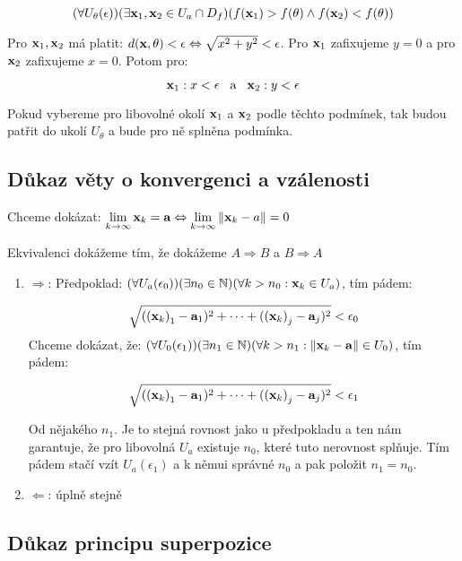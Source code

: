 \[ (\forall U_\theta(\epsilon))(\exists \mathbf{x}_1, \mathbf{x}_2 \in U_a \cap D_f)(f(\mathbf{x}_1) > f(\theta) \wedge f(\mathbf{x}_2) < f(\theta)) \]

\noindent Pro $\mathbf{x}_1, \mathbf{x}_2$ má platit: $d(\mathbf{x}, \theta) < \epsilon \Leftrightarrow \sqrt{x^2 + y^2} < \epsilon$.
Pro $\mathbf{x}_1$ zafixujeme $y = 0$ a pro $\mathbf{x}_2$ zafixujeme $x = 0$. Potom pro:

\[ \mathbf{x}_1: x < \epsilon \hspace{3mm} \text{a} \hspace{3mm} \mathbf{x}_2: y < \epsilon \]

\noindent Pokud vybereme pro libovolné okolí $\mathbf{x}_1$ a $\mathbf{x}_2$ podle těchto podmínek, tak budou patřit do ukolí $U_\theta$ a bude pro ně splněna podmínka.

\subsection*{Důkaz věty o konvergenci a vzálenosti}

Chceme dokázat: $\lim\limits_{k\to\infty} \mathbf{x}_k = \mathbf{a} \Leftrightarrow
    \lim\limits_{k\to\infty} \| \mathbf{x}_k - a \| = 0$

\noindent Ekvivalenci dokážeme tím, že dokážeme $A \Rightarrow B$ a $B \Rightarrow A$

\begin{enumerate}
    \item $\Rightarrow$:
          Předpoklad: $(\forall U_a(\epsilon_0))(\exists n_0 \in \mathbb{N})(\forall k > n_0: \mathbf{x}_k \in U_a)$, tím pádem:

          \[ \sqrt{({(\mathbf{x}_k)}_1 - \mathbf{a}_1)^2 + \cdots + ({(\mathbf{x}_k)}_j - \mathbf{a}_j)^2} < \epsilon_0 \]
          \noindent Chceme dokázat, že: $(\forall U_0(\epsilon_1))(\exists n_1 \in \mathbb{N})(\forall k > n_1: \| \mathbf{x}_k - \mathbf{a} \| \in U_0)$, tím pádem:

          \[ \sqrt{({(\mathbf{x}_k)}_1 - \mathbf{a}_1)^2 + \cdots + ({(\mathbf{x}_k)}_j - \mathbf{a}_j)^2} < \epsilon_1 \]

          \noindent Od nějakého $n_1$. Je to stejná rovnost jako u předpokladu a ten nám garantuje, že pro libovolná $U_a$ existuje $n_0$, které tuto nerovnost splňuje. Tím pádem stačí vzít $U_a(\epsilon_1)$ a k němui správné $n_0$ a pak položit $n_1 = n_0$.
    \item $\Leftarrow$: úplně stejně
\end{enumerate}

\subsection*{Důkaz principu superpozice}

